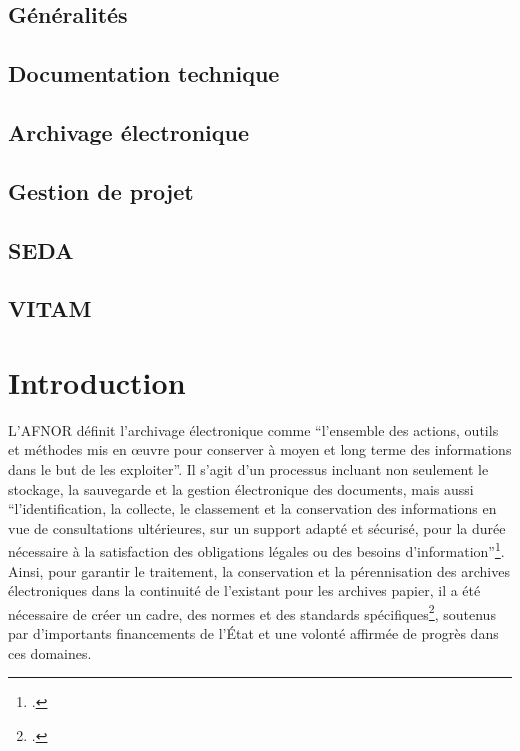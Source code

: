 \documentclass[a4paper,12pt,twoside]{book}
\begin{document}
\section*{Généralités}
\printbibliography[keyword={généralités},heading=none]
\section*{Documentation technique}
\printbibliography[keyword={document technique},heading=none]
\section*{Archivage électronique}
\printbibliography[keyword={Archivage électronique},heading=none]
\section*{Gestion de projet}
\printbibliography[keyword={gestion de projet},heading=none]
\section*{SEDA}
\printbibliography[keyword={SEDA},heading=none]
\section*{VITAM}
\printbibliography[keyword={VITAM},heading=none]
\nocite{*} %
	
\chapter{Introduction}	
\label{Introduction}

L’AFNOR définit l’archivage électronique comme \enquote{l’ensemble des actions, outils et méthodes mis en œuvre pour conserver à moyen et long terme des informations dans le but de les exploiter}. Il s’agit d’un processus incluant non seulement le stockage, la sauvegarde et la gestion électronique des documents, mais aussi \enquote{l’identification, la collecte, le classement et la conservation des informations en vue de consultations ultérieures, sur un support adapté et sécurisé, pour la durée nécessaire à la satisfaction des obligations légales ou des besoins d’information}\footcite{abbassi_stage_2009}. Ainsi, pour garantir le traitement, la conservation et la pérennisation des archives électroniques dans la continuité de l’existant pour les archives papier, il a été nécessaire de créer un cadre, des normes et des standards spécifiques\footcite[pp.61-64]{gueit-montchal_chapitre_2020}, soutenus par d'importants financements de l’État et une volonté affirmée de progrès dans ces domaines.
\end{document}
